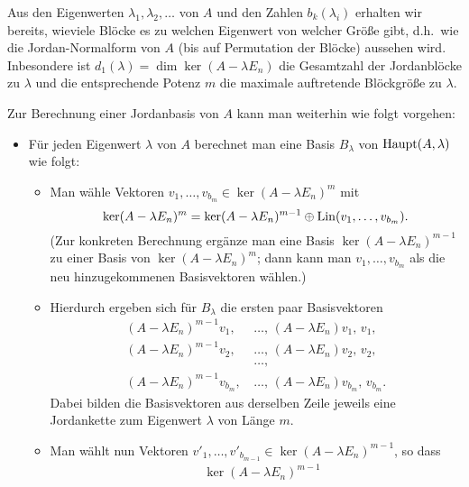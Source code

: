 \documentclass[a4paper,10pt,numbers = noenddot]{scrartcl}
\begin{document}
Aus den Eigenwerten $\lambda_1, \lambda_2, \dotsc$ von $A$ und den Zahlen $b_k(\lambda_i)$ erhalten wir bereits, wieviele Blöcke es zu welchen Eigenwert von welcher Größe gibt, d.h.\ wie die Jordan-Normalform von $A$ (bis auf Permutation der Blöcke) aussehen wird.
Inbesondere ist $d_1(\lambda) = \dim \ker (A - \lambda E_n)$ die Gesamtzahl der Jordanblöcke zu $\lambda$ und die entsprechende Potenz $m$ die maximale auftretende Blöckgröße zu $\lambda$.

Zur Berechnung einer Jordanbasis von $A$ kann man weiterhin wie folgt vorgehen:

\begin{itemize}[resume]
  \item
    Für jeden Eigenwert $\lambda$ von $A$ berechnet man eine Basis $B_\lambda$ von $\operatorname{Haupt}(A, \lambda)$ wie folgt:
    \begin{itemize}
      \item
        Man wähle Vektoren $v_1, \dotsc, v_{b_m} \in \ker (A - \lambda E_n)^m$ mit
        \[
                    \ker (A - \lambda E_n)^m
          =         \ker (A - \lambda E_n)^{m-1}
            \oplus  \operatorname{Lin}(v_1, \dotsc, v_{b_m}).
        \]
        (Zur konkreten Berechnung ergänze man eine Basis $\ker (A - \lambda E_n)^{m-1}$ zu einer Basis von $\ker (A - \lambda E_n)^m$; dann kann man $v_1, \dotsc, v_{b_m}$ als die neu hinzugekommenen Basisvektoren wählen.)
      \item
        Hierdurch ergeben sich für $B_\lambda$ die ersten paar Basisvektoren
        \begin{align*}
          (A - \lambda E_n)^{m-1} v_1,\,      &\dotsc,\,  (A - \lambda E_n) v_1,\,      v_1,      \\
          (A - \lambda E_n)^{m-1} v_2,\,      &\dotsc,\,  (A - \lambda E_n) v_2,\,      v_2,      \\
                                              &\dotsc,                                            \\
          (A - \lambda E_n)^{m-1} v_{b_m},\,  &\dotsc,\,  (A - \lambda E_n) v_{b_m},\,  v_{b_m}.
        \end{align*}
        Dabei bilden die Basisvektoren aus derselben Zeile jeweils eine Jordankette zum Eigenwert $\lambda$ von Länge $m$.
      \item
        Man wählt nun Vektoren $v'_1, \dotsc, v'_{b_{m-1}} \in \ker (A - \lambda E_n)^{m-1}$, so dass
        \begin{align*}
           &\,          \ker (A - \lambda E_n)^{m-1}  \\

\end{align*}
\end{itemize}
\end{itemize}
\end{document}
